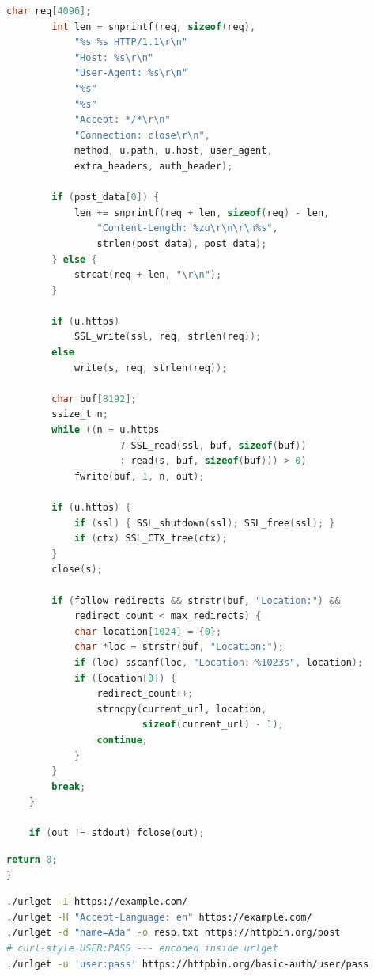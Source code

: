 \begin{lstlisting}[style=newcode,language=C,firstnumber=last]
        char req[4096];
        int len = snprintf(req, sizeof(req),
            "%s %s HTTP/1.1\r\n"
            "Host: %s\r\n"
            "User-Agent: %s\r\n"
            "%s"
            "%s"
            "Accept: */*\r\n"
            "Connection: close\r\n",
            method, u.path, u.host, user_agent,
            extra_headers, auth_header);

        if (post_data[0]) {
            len += snprintf(req + len, sizeof(req) - len,
                "Content-Length: %zu\r\n\r\n%s",
                strlen(post_data), post_data);
        } else {
            strcat(req + len, "\r\n");
        }

        if (u.https)
            SSL_write(ssl, req, strlen(req));
        else
            write(s, req, strlen(req));

        char buf[8192];
        ssize_t n;
        while ((n = u.https
                    ? SSL_read(ssl, buf, sizeof(buf))
                    : read(s, buf, sizeof(buf))) > 0)
            fwrite(buf, 1, n, out);

        if (u.https) {
            if (ssl) { SSL_shutdown(ssl); SSL_free(ssl); }
            if (ctx) SSL_CTX_free(ctx);
        }
        close(s);

        if (follow_redirects && strstr(buf, "Location:") &&
            redirect_count < max_redirects) {
            char location[1024] = {0};
            char *loc = strstr(buf, "Location:");
            if (loc) sscanf(loc, "Location: %1023s", location);
            if (location[0]) {
                redirect_count++;
                strncpy(current_url, location,
                        sizeof(current_url) - 1);
                continue;
            }
        }
        break;
    }

    if (out != stdout) fclose(out);
\end{lstlisting}
\begin{lstlisting}[style=oldcode,language=C,firstnumber=last]
    return 0;
}
\end{lstlisting}
\FullSourceStop

\begin{lstlisting}[style=snippet,language=bash]
./urlget -I https://example.com/
./urlget -H "Accept-Language: en" https://example.com/
./urlget -d "name=Ada" -o resp.txt https://httpbin.org/post
# curl-style USER:PASS --- encoded inside urlget
./urlget -u 'user:pass' https://httpbin.org/basic-auth/user/pass
\end{lstlisting}
